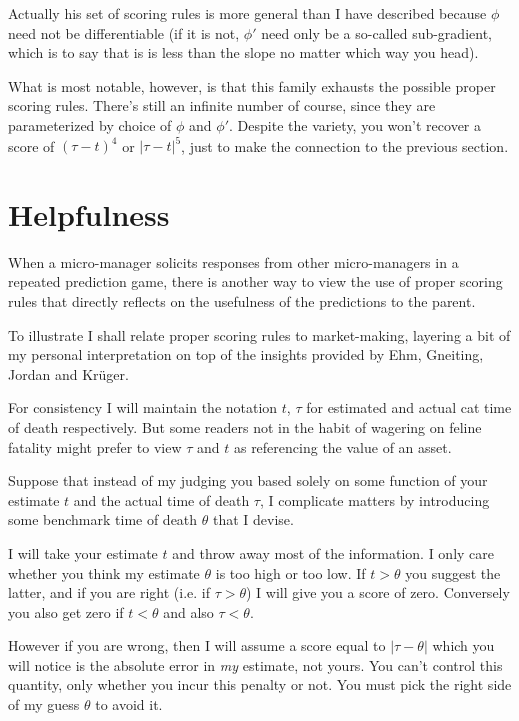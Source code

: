 Actually his set of scoring rules is more general than I have described because $\phi$ need not be differentiable (if it is not, $\phi'$ need only be a so-called sub-gradient, which is to say that is is less than the slope no matter which way you head).

What is most notable, however, is that this family exhausts the possible proper scoring rules. There's still an infinite number of course, since they are parameterized by choice of $\phi$ and $\phi'$. Despite the variety, you won't recover a score of $(\tau-t)^4$ or $|\tau-t|^5$, just to make the connection to the previous section.  


\section{Helpfulness}

When a micro-manager solicits responses from other micro-managers in a repeated prediction game, there is another way to view the use of proper scoring rules that directly reflects on the usefulness of the predictions to the parent.  

To illustrate I shall relate proper scoring rules to market-making, layering a bit of my personal interpretation on top of the insights provided by Ehm, Gneiting, Jordan and Kr\"uger.  

For consistency I will maintain the notation $t$, $\tau$ for estimated and actual cat time of death respectively. But some readers not in the habit of wagering on feline fatality might prefer to view $\tau$ and $t$ as referencing the value of an asset. 

Suppose that instead of my judging you based solely on some function of your estimate $t$ and the actual time of death $\tau$, I complicate matters by introducing some benchmark time of death $\theta$ that I devise. 

I will take your estimate $t$ and throw away most of the information. I only care whether you think my estimate $\theta$ is too high or too low. If $t>\theta$ you suggest the latter, and if you are right (i.e. if $\tau>\theta$) I will give you a score of zero. Conversely you also get zero if $t<\theta$ and also $\tau<\theta$. 

However if you are wrong, then I will assume a score equal to $|\tau-\theta|$ which you will notice is the absolute error in {\em my} estimate, not yours. You can't control this quantity, only whether you incur this penalty or not. You must pick the right side of my guess $\theta$ to avoid it. 

